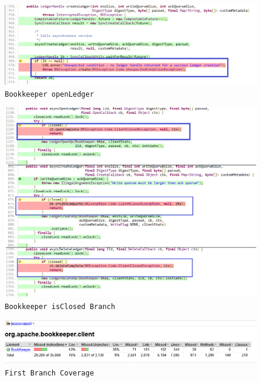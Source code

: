 \documentclass[10pt]{article}
\begin{document}
{		\begin{figure}
			\centering
			\includegraphics[width=1.0\linewidth, frame]{img/bookkeeper-openledger-branch.png}
			\caption{\texttt{Bookkeeper openLedger}}
			\label{fig:BookkeeperOpenLedger}
		\end{figure}
		
		\begin{figure}
			\centering
			\includegraphics[width=1.0\linewidth, frame]{img/bookkeeper-is_closed-branch.png}
			\caption{\texttt{Bookkeeper isClosed Branch}}
			\label{fig:BookkeeperIsClosed}
		\end{figure}
		
		\begin{figure}
			\centering
			\includegraphics[width=1.0\linewidth, frame]{img/Bookeeper-first-Coverage.png}
			\caption{\texttt{First Branch Coverage}}
			\label{fig:BookeeperFirstCoverage}
		\end{figure}
		
}
\end{document}
